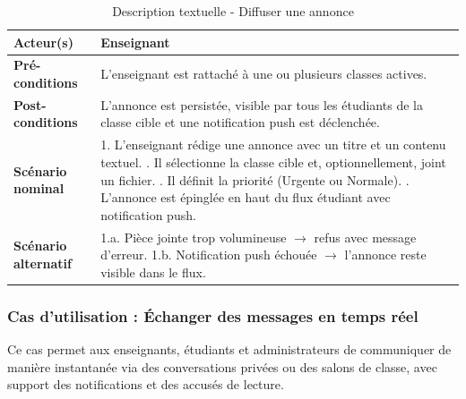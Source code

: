 \begin{table}[H]
\centering
\small
\begin{tabularx}{\textwidth}{|l|X|}
\hline
\rowcolor[HTML]{EFEFEF} 
\textbf{Acteur(s)} & Enseignant \\ \hline
\textbf{Pré-conditions} & L'enseignant est rattaché à une ou plusieurs classes actives. \\ \hline
\textbf{Post-conditions} & L'annonce est persistée, visible par tous les étudiants de la classe cible et une notification push est déclenchée. \\ \hline
\textbf{Scénario nominal} & 
1. L'enseignant rédige une annonce avec un titre et un contenu textuel. \newline
2. Il sélectionne la classe cible et, optionnellement, joint un fichier. \newline
3. Il définit la priorité (Urgente ou Normale). \newline
4. L'annonce est épinglée en haut du flux étudiant avec notification push. \\ \hline
\textbf{Scénario alternatif} & 
1.a. Pièce jointe trop volumineuse $\rightarrow$ refus avec message d'erreur. \newline
1.b. Notification push échouée $\rightarrow$ l'annonce reste visible dans le flux. \\ \hline
\end{tabularx}
\caption{Description textuelle - Diffuser une annonce}
\end{table}

\subsubsection{Cas d'utilisation : Échanger des messages en temps réel}
Ce cas permet aux enseignants, étudiants et administrateurs de communiquer de manière instantanée via des conversations privées ou des salons de classe, avec support des notifications et des accusés de lecture.

